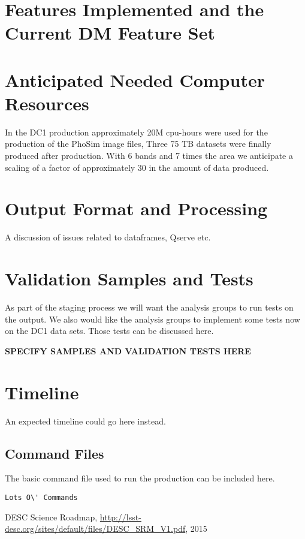 \documentclass[12pt,letterpaper]{article}
\begin{document}
\section{Features Implemented and the Current DM Feature Set}

\section{Anticipated Needed Computer Resources}

In the DC1 production approximately 20M cpu-hours were used for the
production of the PhoSim image files, Three 75 TB datasets were
finally produced after production.  With 6 bands and 7 times the area
we anticipate a scaling of a factor of approximately 30 in the amount
of data produced.

\section{Output Format and Processing}

A discussion of issues related to dataframes, Qserve etc.

\section{Validation Samples and Tests}

As part of the staging process we will want the analysis groups to run
tests on the output.  We also would like the analysis groups to
implement some tests now on the DC1 data sets.  Those tests can be
discussed here.

\noindent
{\bf SPECIFY SAMPLES AND VALIDATION TESTS HERE}


\section{Timeline}

An expected timeline could go here instead.

\begin{appendices}

\section{Command Files}
\label{sec:command-file}

The basic command file used to run the production can be
included here.

\begin{verbatim}
Lots O\' Commands
\end{verbatim}

\end{appendices}

\begin{thebibliography}{100}

DESC Science Roadmap,
\url{http://lsst-desc.org/sites/default/files/DESC_SRM_V1.pdf}, 2015

\end{thebibliography}
\end{document}
